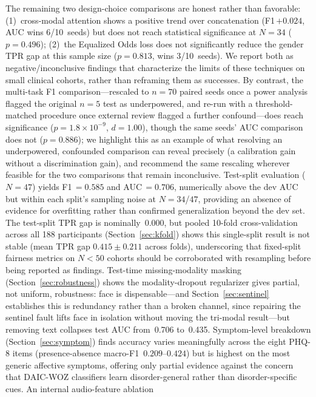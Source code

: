 \documentclass[journal]{IEEEtran}
\begin{document}
The remaining two design-choice comparisons are honest rather than
favorable: (1)~cross-modal attention shows a positive trend over
concatenation (F1\,$+0.024$, AUC wins 6/10~seeds) but does not reach
statistical significance at $N{=}34$ ($p{=}0.496$); (2)~the Equalized
Odds loss does not significantly reduce the gender TPR gap at this
sample size ($p{=}0.813$, wins 3/10~seeds). We report both as
negative/inconclusive findings that characterize the limits of these
techniques on small clinical cohorts, rather than reframing them as
successes. By contrast, the multi-task F1 comparison---rescaled to
$n{=}70$ paired seeds once a power analysis flagged the original
$n{=}5$ test as underpowered, and re-run with a threshold-matched
procedure once external review flagged a further confound---does
reach significance ($p{=}1.8{\times}10^{-9}$, $d{=}1.00$), though the
same seeds' AUC comparison does not ($p{=}0.886$); we highlight this
as an example of what resolving an underpowered, confounded
comparison can reveal precisely (a calibration gain without a
discrimination gain), and recommend the same rescaling wherever
feasible for the two comparisons that remain inconclusive.
Test-split evaluation ($N{=}47$) yields F1\,$=0.585$ and
AUC\,$=0.706$, numerically above the dev AUC but within each split's
sampling noise at $N{=}34$/$47$, providing an absence of evidence for
overfitting rather than confirmed generalization beyond the dev set.
The test-split TPR gap is
nominally~0.000, but pooled 10-fold cross-validation across all
188 participants (Section~\ref{sec:kfold}) shows this single-split
result is not stable (mean TPR gap $0.415\pm0.211$ across folds),
underscoring that fixed-split fairness metrics on $N{<}50$ cohorts
should be corroborated with resampling before being reported as
findings. Test-time missing-modality masking
(Section~\ref{sec:robustness}) shows the modality-dropout regularizer
gives partial, not uniform, robustness: face is dispensable---and
Section~\ref{sec:sentinel} establishes this is redundancy rather than a
broken channel, since repairing the sentinel fault lifts face in
isolation without moving the tri-modal result---but
removing text collapses test AUC from~0.706 to~0.435. Symptom-level
breakdown (Section~\ref{sec:symptom}) finds accuracy varies
meaningfully across the eight PHQ-8 items (presence-absence
macro-F1~$0.209$--$0.424$) but is highest on the most generic
affective symptoms, offering only partial evidence against the
concern that DAIC-WOZ classifiers learn disorder-general rather than
disorder-specific cues. An internal audio-feature ablation
\end{document}
